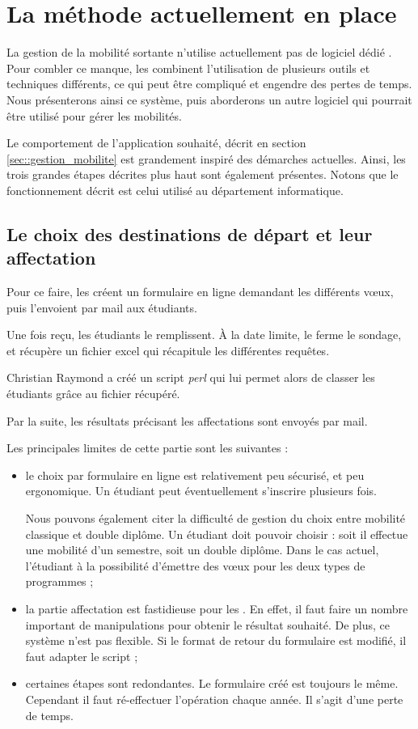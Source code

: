 
		\section{La méthode actuellement en place}
	

La gestion de la mobilité sortante n'utilise actuellement pas de logiciel dédié . 
Pour combler ce manque, les \ris combinent l'utilisation de plusieurs outils et techniques différents, ce qui peut être compliqué et engendre des pertes de temps. 
Nous présenterons ainsi ce système, puis aborderons un autre logiciel qui pourrait être utilisé pour gérer les mobilités.

\medbreak

Le comportement de l'application souhaité, décrit en section \ref{sec::gestion_mobilite} est grandement inspiré des démarches actuelles. 
Ainsi, les trois grandes étapes décrites plus haut sont également présentes. 
Notons que le fonctionnement  décrit est celui utilisé au département informatique.  
 \subsection{Le choix des destinations de départ et leur affectation}
		 
		Pour ce faire, les \ris créent un formulaire en ligne demandant les différents vœux, puis l'envoient par mail aux étudiants. 
		
		Une fois reçu, les étudiants le remplissent. À la date limite, le \ri ferme le sondage, et récupère un fichier excel qui récapitule les différentes requêtes. 
		
		Christian Raymond a créé un script \textit{perl} qui lui permet alors de classer les étudiants grâce au fichier récupéré.
		
		Par la suite, les résultats  précisant les affectations sont envoyés par mail. 
		
		\medbreak
		
		Les principales limites de cette partie sont les suivantes : 
		\begin{itemize}
		\item le choix par formulaire en ligne est relativement peu sécurisé, et peu ergonomique. Un étudiant peut  éventuellement s'inscrire plusieurs fois.
		
		Nous pouvons également citer la difficulté de gestion du choix entre mobilité classique et double diplôme. Un étudiant doit pouvoir choisir : soit il effectue une mobilité d'un semestre, soit un double diplôme. Dans le cas actuel, l'étudiant à la possibilité d'émettre des vœux pour les deux types de programmes ;
		
		\item la partie affectation est fastidieuse  pour les \ris. En effet, il faut faire un nombre important de manipulations pour obtenir le résultat  souhaité. De plus, ce système n'est pas flexible. Si le format de retour du formulaire est modifié, il faut adapter le script ;

		\item certaines étapes sont redondantes. Le formulaire créé est toujours le même. Cependant il faut ré-effectuer l'opération chaque année. Il s'agit d'une perte de temps.
			\end{itemize}

